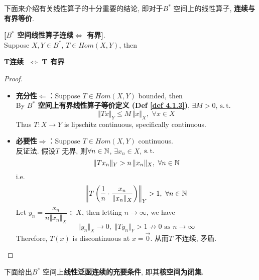 	\newpage
	
	下面来介绍有关线性算子的十分重要的结论, 即对于$B^*$ 空间上的线性算子, \textbf{连续与有界等价}. 
	
	\begin{proposition}\label{prop 4.1.1}
		\textbf{[$B^*$ 空间线性算子连续$\Leftrightarrow$ 有界]}. \\
		Suppose $X , Y \in B^*$, $T \in Hom(X , Y)$, then
		\begin{center}
			\textbf{T连续 $\,\, \Leftrightarrow \,\, $T 有界}
		\end{center}
		
		\vspace*{4em}
		
		\begin{proof}
			\begin{itemize}
				\item \textbf{充分性$\Leftarrow$}：Suppose $T \in Hom(X, Y)$ bounded, then \\
				By \textbf{$B^*$ 空间上有界线性算子等价定义 (Def \ref{def 4.1.3})}, $\exists M > 0$, $\operatorname{s.t.}$
				\[ \Vert Tx \Vert_Y \leq M \, \Vert x \Vert_X , \,\, \forall x \in X \]
				Thus $T : X \longrightarrow Y$ is lipschitz continuous, specifically continuous. 
				
				\vspace*{6em}
				
				\item \textbf{必要性$\Rightarrow$}：Suppose $T \in Hom(X , Y)$ continuous. \\
				反证法. 假设$T$ 无界, 则$\forall n \in \mathbb{N}$, $\exists x_n \in X$, $\operatorname{s.t.}$
				\[ \Vert T x_n \Vert_Y > n \, \Vert x_n \Vert_X , \,\, \forall n \in \mathbb{N} \]
				i.e. 
				\[ \left\Vert T \left( \frac{1}{n} \cdot \frac{x_n}{\Vert x_n \Vert_X} \right) \right\Vert_Y > 1 , \,\, \forall n \in \mathbb{N} \]
				Let $y_n = \dfrac{x_n}{n \Vert x_n \Vert_X} \in X$, then letting $n \to \infty$, we have
				\[ \Vert y_n \Vert_X \to 0 , \,\, \Vert Ty_n \Vert_Y > 1 \not\to 0 \,\, \text{as} \,\, n \to \infty \]
				Therefore, $T(x)$ is discontinuous at $x = \overrightarrow{0}$. 从而$T$ 不连续, 矛盾.
			\end{itemize}
		\end{proof}
	\end{proposition}
	
	\newpage
	
	下面给出$B^*$ 空间上\textbf{线性泛函连续的充要条件}, 即其\textbf{核空间为闭集}. 
	
